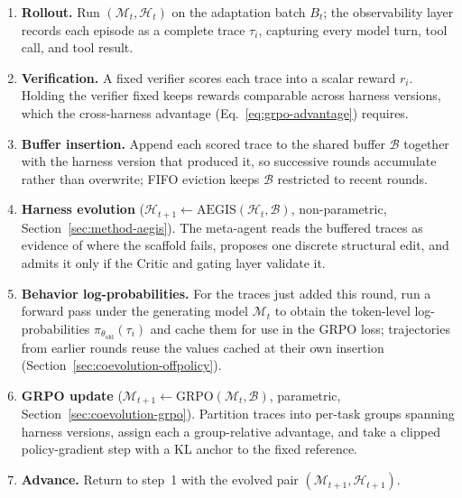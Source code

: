\begin{enumerate}[leftmargin=*]
  \item \textbf{Rollout.} Run $(\mathcal{M}_t, \mathcal{H}_t)$ on the adaptation batch $B_t$; the observability layer records each episode as a complete trace $\tau_i$, capturing every model turn, tool call, and tool result.

  \item \textbf{Verification.} A fixed verifier scores each trace into a scalar reward $r_i$. Holding the verifier fixed keeps rewards comparable across harness versions, which the cross-harness advantage (Eq.~\ref{eq:grpo-advantage}) requires.

  \item \textbf{Buffer insertion.} Append each scored trace to the shared buffer $\mathcal{B}$ together with the harness version that produced it, so successive rounds accumulate rather than overwrite; FIFO eviction keeps $\mathcal{B}$ restricted to recent rounds.

  \item \textbf{Harness evolution} ($\mathcal{H}_{t+1} \leftarrow \text{AEGIS}(\mathcal{H}_t, \mathcal{B})$, non-parametric, Section~\ref{sec:method-aegis}). The meta-agent reads the buffered traces as evidence of where the scaffold fails, proposes one discrete structural edit, and admits it only if the Critic and gating layer validate it.

  \item \textbf{Behavior log-probabilities.} For the traces just added this round, run a forward pass under the generating model $\mathcal{M}_t$ to obtain the token-level log-probabilities $\pi_{\theta_{\text{old}}}(\tau_i)$ and cache them for use in the GRPO loss; trajectories from earlier rounds reuse the values cached at their own insertion (Section~\ref{sec:coevolution-offpolicy}).

  \item \textbf{GRPO update} ($\mathcal{M}_{t+1} \leftarrow \text{GRPO}(\mathcal{M}_t, \mathcal{B})$, parametric, Section~\ref{sec:coevolution-grpo}). Partition traces into per-task groups spanning harness versions, assign each a group-relative advantage, and take a clipped policy-gradient step with a KL anchor to the fixed reference.

  \item \textbf{Advance.} Return to step~1 with the evolved pair $(\mathcal{M}_{t+1}, \mathcal{H}_{t+1})$.
\end{enumerate}


